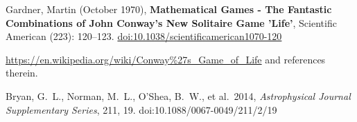 \documentclass[11pt]{amsart}
\begin{document}

\begin{thebibliography}{2}

Gardner, Martin (October 1970), \textbf{Mathematical Games - The Fantastic Combinations of John Conway's New Solitaire Game 'Life'}, Scientific American (223): 120–123. \href{doi:10.1038/scientificamerican1070-120}{doi:10.1038/scientificamerican1070-120}

\href{https://en.wikipedia.org/wiki/Conway\%27s_Game_of_Life}{https://en.wikipedia.org/wiki/Conway\%27s\_Game\_of\_Life} and references therein.

 Bryan, G.~L., Norman, M.~L., O'Shea, B.~W., et al.\ 2014, \textit{Astrophysical Journal Supplementary Series}, 211, 19. doi:10.1088/0067-0049/211/2/19

\end{thebibliography}
\end{document}
